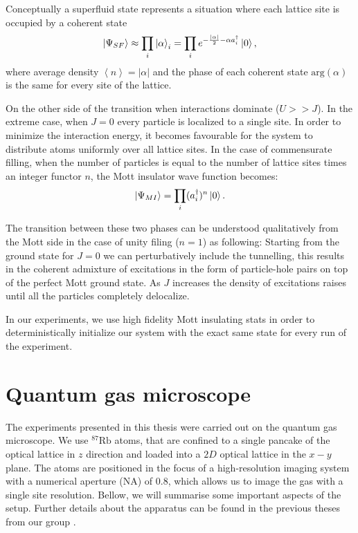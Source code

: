 Conceptually a superfluid state represents a situation where each lattice site is occupied by a coherent state
\begin{equation}
\left|\Psi_{SF}\right\rangle \approx\prod_i \left|\alpha\right\rangle_i=\prod_i e^{-\frac{\left| \alpha \right|}{2}-\alpha a^\dagger_i}\left|0\right\rangle,
\end{equation}
where average density $\left<n\right> = \left| \alpha \right|$ and the phase of each coherent state $\textrm{arg}(\alpha)$ is the same for every site of the lattice.

On the other side of the transition when interactions dominate ($U>>J$). In the extreme case, when $J=0$ every particle is localized to a single site. In order to minimize the interaction energy, it becomes favourable for the system to distribute atoms uniformly over all lattice sites. In the case of commensurate filling, when the number of particles is equal to the number of lattice sites times an integer functor $n$, the Mott insulator wave function becomes:
\begin{equation}
\left|\Psi_{MI}\right\rangle =\prod_i (a_i^\dagger)^n\left|0\right\rangle.
\end{equation}

The transition between these two phases can be understood qualitatively from the Mott side in the case of unity filing ($n=1$) as following: Starting from the ground state for $J=0$ we can perturbatively include the tunnelling, this results in the coherent admixture of excitations in the form of particle-hole pairs on top of the perfect Mott ground state. As $J$ increases the density of excitations raises until all the particles completely delocalize. 

In our experiments, we use high fidelity Mott insulating stats in order to deterministically initialize our system with the exact same state for every run of the experiment.

\section{Quantum gas microscope}
The experiments presented in this thesis were carried out on the quantum gas microscope. We use $^{87}\textrm{Rb}$ atoms, that are confined to a single pancake of the optical lattice in $z$ direction and loaded into a $2D$ optical lattice in the $x-y$ plane. The atoms are positioned in the focus of a high-resolution imaging system with a numerical aperture (NA) of $0.8$, which allows us to image the gas with a single site resolution. Bellow, we will summarise some important aspects of the setup. Further details about the apparatus can be found in the previous theses from our group \cite{peng, gillen, Backr}.

